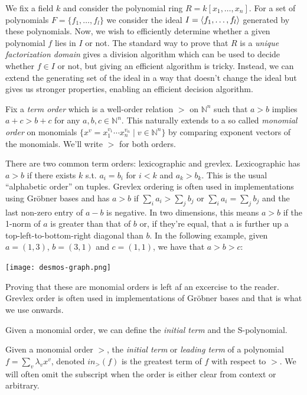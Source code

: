 \documentclass{article}
\theoremstyle{changedot}
\theoremstyle{changedotbreak}
\theoremstyle{nonumberplain}
\DeclarePairedDelimiter{\tuple}{\langle}{\rangle}
\begin{document}
We fix a field $k$ and consider the polynomial ring $R = k[x_{1}, \dots, x_{n}]$. For a set of polynomials $F = \{f_{1}, \dots, f_{l}\}$ we consider the ideal $I = \tuple{f_{1}, \dots, f_{l}}$ generated by these polynomials. Now, we wish to efficiently determine whether a given polynomial $f$ lies in $I$ or not. The standard way to prove that $R$ is a \emph{unique factorization domain} gives a division algorithm which can be used to decide whether $f \in I$ or not, but giving an efficient algorithm is tricky. Instead, we can extend the generating set of the ideal in a way that doesn't change the ideal but gives us stronger properties, enabling an efficient decision algorithm.

Fix a \emph{term order} which is a well-order relation $>$ on $\mathbb N^{n}$ such that $a > b$ implies $a + c > b + c$ for any $a, b, c \in \mathbb N^{n}$. This naturally extends to a so called \emph{monomial order} on monomials $\{x^{v} = x_{1}^{v_{1}} \cdots x_{n}^{v_{n}} \mid v \in \mathbb N^{n}\}$ by comparing exponent vectors of the monomials. We'll write $>$ for both orders.

There are two common term orders: lexicographic and grevlex. Lexicographic has $a > b$ if there exists $k$ s.t. $a_{i} = b_{i}$ for $i < k$ and $a_{k} > b_{k}$. This is the usual ``alphabetic order'' on tuples. Grevlex ordering is often used in implementations using Gröbner bases and has $a > b$ if $\sum_{i} a_{i} > \sum_{j} b_{j}$ or   $\sum_{i} a_{i} = \sum_{j} b_{j}$ and the last non-zero entry of $a - b$ is negative. In two dimensions, this means $a > b$ if the 1-norm of $a$ is greater than that of $b$ or, if they're equal, that a is further up a top-left-to-bottom-right diagonal than $b$. In the following example, given $a=(1, 3)$, $b=(3, 1)$ and $c=(1, 1)$, we have that $a > b > c$:

\begin{center}
  \texttt{[image: desmos-graph.png]}
\end{center}

Proving that these are monomial orders is left af an excercise to the reader. Grevlex order is often used in implementations of Gröbner bases and that is what we use onwards.

Given a monomial order, we can define the \emph{initial term} and the S-polynomial.

\begin{definition}
  Given a monomial order $>$, the \emph{initial term} or \emph{leading term} of a polynomial $f = \sum_{v} \lambda_{v} x^{v}$, denoted $in_{>}(f)$ is the greatest term of $f$ with respect to $>$. We will often omit the subscript when the order is either clear from context or arbitrary.
\end{definition}
\end{document}
